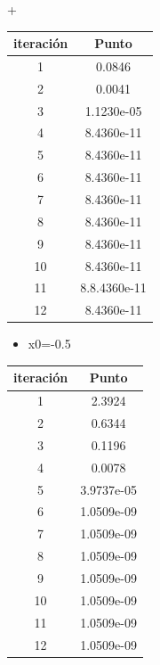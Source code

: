 +\documentclass{udpreport}
\begin{document}
\begin{enumerate}
\begin{enumerate}
\begin{table}[H]
\begin{tabular} { |c|c|}
        \hline
        iteración  &  Punto\\
        \hline
        1 &      0.0846   \\
         \hline
        2 &    0.0041    \\
         \hline
        3 &   1.1230e-05 \\
         \hline
        4 &   8.4360e-11    \\
         \hline
        5 &    8.4360e-11  \\
         \hline
        6 &   8.4360e-11     \\
         \hline
        7 & 8.4360e-11    \\
         \hline
        8 &  8.4360e-11   \\
         \hline
        9 &   8.4360e-11      \\
         \hline
        10 &   8.4360e-11      \\
         \hline
        11 & 8.8.4360e-11  \\
         \hline
        12 &  8.4360e-11      \\
        \hline
        
        \end{tabular}
        
    \end{table}
     \begin{itemize}
\item x0=-0.5
\end{itemize}

\begin{table}[H]
    \centering
        \begin{tabular} { |c|c|}
        
        \hline
        iteración  &  Punto\\
        \hline
        1 &     2.3924  \\
         \hline
        2 &    0.6344   \\
         \hline
        3 &   0.1196 \\
         \hline
        4 &    0.0078   \\
         \hline
        5 &   3.9737e-05  \\
         \hline
        6 &   1.0509e-09    \\
         \hline
        7 & 1.0509e-09   \\
         \hline
        8 &  1.0509e-09  \\
         \hline
        9 &  1.0509e-09      \\
         \hline
        10 &  1.0509e-09      \\
         \hline
        11 & 1.0509e-09   \\
         \hline
        12 &  1.0509e-09     \\
        \hline
        

\end{tabular}
\end{table}
\end{enumerate}
\end{enumerate}
\end{document}
